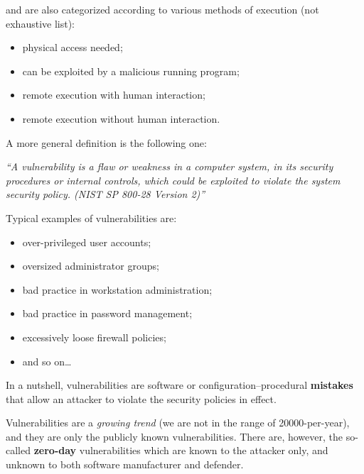 \documentclass[10pt]{\classname}
\begin{document}
and are also categorized according to various methods of execution (not
exhaustive list):
\begin{itemize}
    \item physical access needed;
    \item can be exploited by a malicious running program;
    \item remote execution with human interaction;
    \item remote execution without human interaction.
\end{itemize}



A more general definition is the following one:

\vspace*{1cm}
\begin{center}
    \emph{``A vulnerability is a flaw or weakness in a computer system, in its
    security procedures or internal controls, which could be exploited to
violate the system security policy. (NIST SP 800-28 Version 2)''}
\end{center}
\vspace*{1cm}

Typical examples of vulnerabilities are:
\begin{itemize}
    \item over\--privileged user accounts;
    \item oversized administrator groups;
    \item bad practice in workstation administration;
    \item bad practice in password management;
    \item excessively loose firewall policies;
    \item and so on\dots
\end{itemize}

In a nutshell, vulnerabilities are software or configuration\---procedural
\textbf{mistakes} that allow an attacker to violate the security policies in
effect.

Vulnerabilities are a \emph{growing trend} (we are not in the range of
20000\--per\--year), and they are only the publicly known vulnerabilities.
There are, however, the so\--called \textbf{zero\--day} vulnerabilities which
are known to the attacker only, and unknown to both software manufacturer and
defender.
\end{document}
